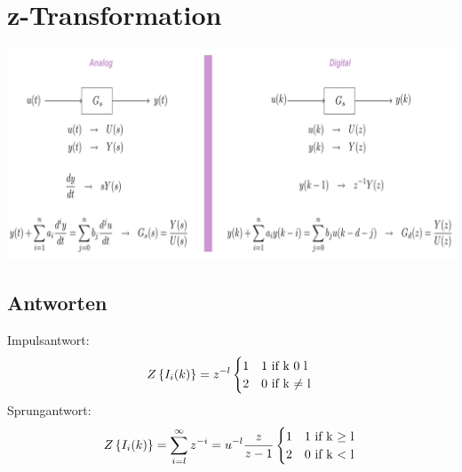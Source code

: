 \section{z-Transformation}
\begin{center}
	\includegraphics[scale = 0.25]{images/z_transf.png}
\end{center}
\subsection{Antworten}
Impulsantwort:
\[
	Z\left\lbrace I_i(k)\right\rbrace  =z^{-l}\\
	\\\begin{cases}1&\text{1 if k $0$ l}\\2&\text{0 if k $\neq$ l}\end{cases} \\ \\
\]
Sprungantwort:
\[
	Z\left\lbrace I_i(k)\right\rbrace  =\sum_{i=l}^{\infty}z^{-i}=u^{-l}\frac{z}{z-1}
	\\\begin{cases}1&\text{1 if k $\geq$ l}\\2&\text{0 if k $<$ l}\end{cases} \\ \\
\]

